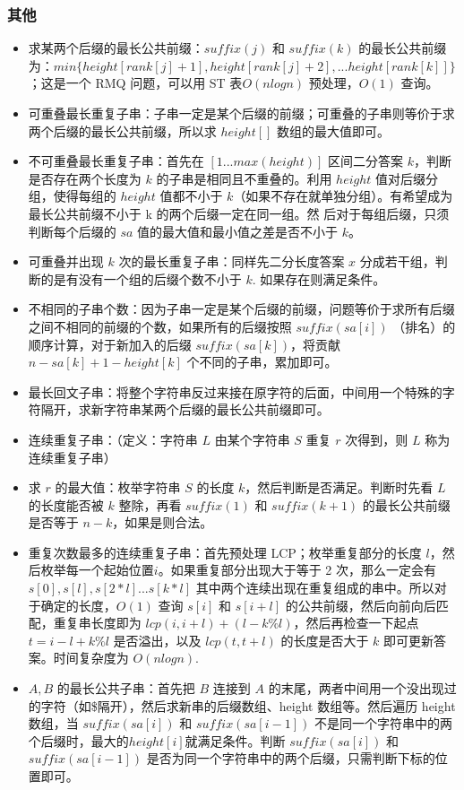 \subsubsection{其他}
\begin{itemize}
    \item 求某两个后缀的最长公共前缀：$suffix(j)$ 和 $suffix(k)$ 的最长公共前缀为：$min\{height[rank[j] + 1], height[rank[j] + 2], ... height[rank[k]]\}$；这是一个 RMQ 问题，可以用 ST 表$O(nlogn)$ 预处理，$O(1)$ 查询。
    \item 可重叠最长重复子串：子串一定是某个后缀的前缀；可重叠的子串则等价于求两个后缀的最长公共前缀，所以求 $height[]$ 数组的最大值即可。
    \item 不可重叠最长重复子串：首先在 $[1...max(height)]$ 区间二分答案 $k$，判断是否存在两个长度为 $k$ 的子串是相同且不重叠的。利用 $height$ 值对后缀分组，使得每组的 $height$ 值都不小于 $k$（如果不存在就单独分组）。有希望成为最长公共前缀不小于 k 的两个后缀一定在同一组。然
    后对于每组后缀，只须判断每个后缀的 $sa$ 值的最大值和最小值之差是否不小于 $k$。
    \item 可重叠并出现 $k$ 次的最长重复子串：同样先二分长度答案 $x$ 分成若干组，判断的是有没有一个组的后缀个数不小于 $k$. 如果存在则满足条件。
    \item 不相同的子串个数：因为子串一定是某个后缀的前缀，问题等价于求所有后缀之间不相同的前缀的个数，如果所有的后缀按照 $suffix(sa[i])$ （排名）的顺序计算，对于新加入的后缀 $suffix(sa[k])$，将贡献 $n - sa[k] + 1 - height[k]$ 个不同的子串，累加即可。
    \item 最长回文子串：将整个字符串反过来接在原字符的后面，中间用一个特殊的字符隔开，求新字符串某两个后缀的最长公共前缀即可。
    \item 连续重复子串：（定义：字符串 $L$ 由某个字符串 $S$ 重复 $r$ 次得到，则 $L$ 称为连续重复子串）
    \item 求 $r$ 的最大值：枚举字符串 $S$ 的长度 $k$，然后判断是否满足。判断时先看 $L$ 的长度能否被 $k$ 整除，再看 $suffix(1)$ 和 $suffix(k+1)$ 的最长公共前缀是否等于 $n-k$，如果是则合法。
    \item 重复次数最多的连续重复子串：首先预处理 LCP；枚举重复部分的长度 $l$，然后枚举每一个起始位置$i$。如果重复部分出现大于等于 2 次，那么一定会有 $s[0], s[l], s[2*l]...s[k*l]$ 其中两个连续出现在重复组成的串中。所以对于确定的长度，$O(1)$ 查询 $s[i]$ 和 $s[i+l]$ 的公共前缀，然后向前向后匹配，重复串长度即为 $lcp(i, i + l) + (l - k \% l)$，然后再检查一下起点 $t=i-l+k\%l$ 是否溢出，以及 $lcp(t, t+l)$ 的长度是否大于 $k$ 即可更新答案。时间复杂度为 $O(nlogn)$.
    \item $A,B$ 的最长公共子串：首先把 $B$ 连接到 $A$ 的末尾，两者中间用一个没出现过的字符（如\$隔开），然后求新串的后缀数组、height 数组等。然后遍历 height 数组，当 $suffix(sa[i])$ 和 $suffix(sa[i-1])$ 不是同一个字符串中的两个后缀时，最大的$height[i]$就满足条件。判断 $suffix(sa[i])$ 和 $suffix(sa[i-1])$ 是否为同一个字符串中的两个后缀，只需判断下标的位置即可。

\end{itemize}
